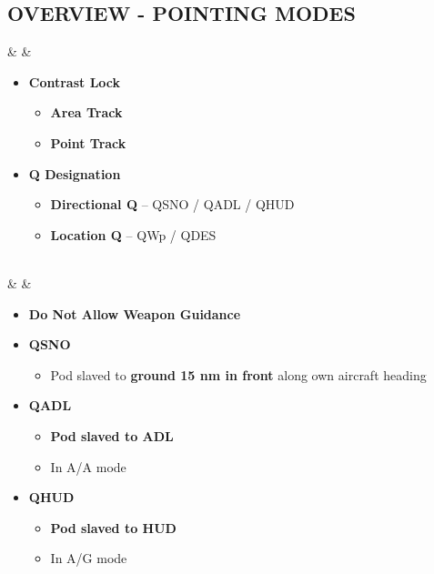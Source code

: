 \documentclass[fontInter]{TechCheck}
\begin{document}
	\clearpage

	\subsection{OVERVIEW - POINTING MODES}
	\begin{listlongtable}
		\textbf{\textbullet} &   &
		\begin{minipage}[t]{\linewidth}
			\vspace{-7pt}
			\begin{itemize}
				\item \textbf{Contrast Lock}
				\begin{itemize}
					\item \textbf{Area Track}
					\item \textbf{Point Track}
				\end{itemize}
				\item \textbf{Q Designation}
				\begin{itemize}
					\item \textbf{Directional Q} -- QSNO / QADL / QHUD
					\item \textbf{Location Q} -- QWp / QDES
				\end{itemize}
			\end{itemize}
		\end{minipage} \\
		\midrule
		\textbf{\textbullet} &  &
		\begin{minipage}[t]{\linewidth}
			\vspace{-7pt}
			\begin{itemize}
				\item \textbf{Do Not Allow Weapon Guidance}
				\item \textbf{QSNO}
				\begin{itemize}
					\item Pod slaved to \textbf{ground 15 nm in front} along own aircraft heading
				\end{itemize}
				\item \textbf{QADL}
				\begin{itemize}
					\item \textbf{Pod slaved to ADL}
					\item In A/A mode
				\end{itemize}
				\item \textbf{QHUD}
				\begin{itemize}
					\item \textbf{Pod slaved to HUD}
					\item In A/G mode

\end{itemize}
\end{itemize}
\end{minipage}
\end{listlongtable}
\end{document}
